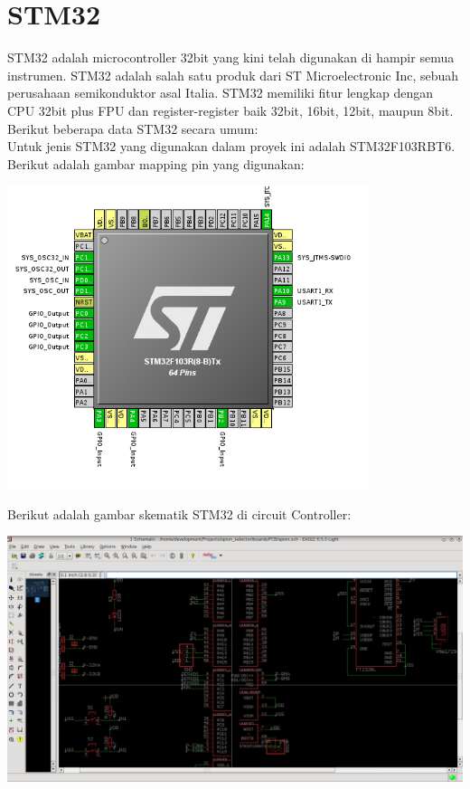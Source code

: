 \documentclass[11pt,fleqn]{book} %
\begin{document}
\section{STM32}
\begin{flushleft}
 \hspace{10pt} STM32 adalah microcontroller 32bit yang kini telah digunakan di hampir semua instrumen.
 STM32 adalah salah satu produk dari ST Microelectronic Inc, sebuah perusahaan semikonduktor asal Italia.
 STM32 memiliki fitur lengkap dengan CPU 32bit plus FPU dan register-register baik 32bit, 16bit, 12bit, maupun 8bit.
 Berikut beberapa data STM32 secara umum:\\
 
 \hspace{10pt} Untuk jenis STM32 yang digunakan dalam proyek ini adalah STM32F103RBT6.
 Berikut adalah gambar mapping pin yang digunakan:
 \begin{center}
 \includegraphics[width=300pt]{./screenshot/stm32/stm32_pin}\\
\end{center}
Berikut adalah gambar skematik STM32 di circuit Controller:
 \begin{center}
 \includegraphics[width=400pt]{./screenshot/stm32/stm321}\\

\end{center}
\end{flushleft}
\end{document}
